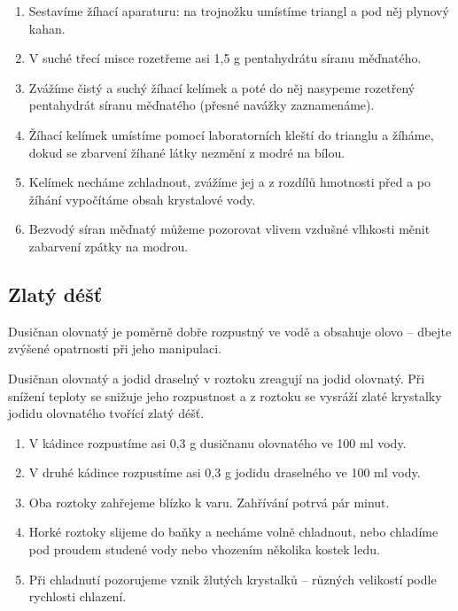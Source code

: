\hspace{-21px} 

\begin{enumerate}
  \item Sestavíme žíhací aparaturu: na trojnožku umístíme triangl a pod něj plynový kahan.
  \item V suché třecí misce rozetřeme asi 1,5 g pentahydrátu síranu měďnatého.
  \item Zvážíme čistý a suchý žíhací kelímek a poté do něj nasypeme rozetřený pentahydrát síranu měďnatého (přesné navážky zaznamenáme).
  \item Žíhací kelímek umístíme pomocí laboratorních kleští do trianglu a žíháme, dokud se zbarvení žíhané látky nezmění z modré na bílou.
  \item Kelímek necháme zchladnout, zvážíme jej a z rozdílů hmotnosti před a po žíhání vypočítáme obsah krystalové vody.
  \item Bezvodý síran měďnatý můžeme pozorovat vlivem vzdušné vlhkosti měnit zabarvení zpátky na modrou.
\end{enumerate}

\subsection{Zlatý déšť}


Dusičnan olovnatý je poměrně dobře rozpustný ve vodě a obsahuje olovo -- dbejte zvýšené opatrnosti při jeho manipulaci.

\hspace{-21px} 

Dusičnan olovnatý a jodid draselný v roztoku zreagují na jodid olovnatý. Při snížení teploty se snižuje jeho rozpustnost a z roztoku se vysráží zlaté krystalky jodidu olovnatého tvořící zlatý déšť.

\hspace{-21px} 

\begin{enumerate}
  \item V kádince rozpustíme asi 0,3 g dusičnanu olovnatého ve 100 ml vody.
  \item V druhé kádince rozpustíme asi 0,3 g jodidu draselného ve 100 ml vody.
  \item Oba roztoky zahřejeme blízko k varu. Zahřívání potrvá pár minut.
  \item Horké roztoky slijeme do baňky a necháme volně chladnout, nebo chladíme pod proudem studené vody nebo vhozením několika kostek ledu.
  \item Při chladnutí pozorujeme vznik žlutých krystalků -- různých velikostí podle rychlosti chlazení.
\end{enumerate}

